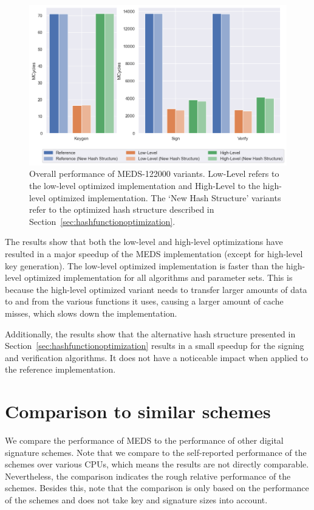 \documentclass[11pt,a4paper]{report}
\theoremstyle{definition}
\begin{document}
\begin{figure}
  \centering
  \includegraphics[width=\textwidth]{plots/barplot_MEDS-122000.png}
  \caption{Overall performance of MEDS-122000 variants. Low-Level refers to the low-level optimized implementation and High-Level to the high-level optimized implementation. The `New Hash Structure' variants refer to the optimized hash structure described in Section~\ref{sec:hashfunctionoptimization}.}
  \label{fig:overal_performance_bar_chart_MEDS-122000}
\end{figure}

The results show that both the low-level and high-level optimizations have resulted in a major speedup of the MEDS implementation (except for high-level key generation). The low-level optimized implementation is faster than the high-level optimized implementation for all algorithms and parameter sets. This is because the high-level optimized variant needs to transfer larger amounts of data to and from the various functions it uses, causing a larger amount of cache misses, which slows down the implementation.

Additionally, the results show that the alternative hash structure presented in Section~\ref{sec:hashfunctionoptimization} results in a small speedup for the signing and verification algorithms. It does not have a noticeable impact when applied to the reference implementation.

\section{Comparison to similar schemes}
\label{sec:comparison}
We compare the performance of MEDS to the performance of other digital signature schemes. Note that we compare to the self-reported performance of the schemes over various CPUs, which means the results are not directly comparable. Nevertheless, the comparison indicates the rough relative performance of the schemes. Besides this, note that the comparison is only based on the performance of the schemes and does not take key and signature sizes into account.
\end{document}
